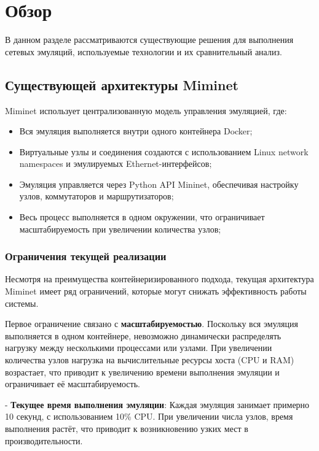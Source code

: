 
\section{Обзор}
\label{sec:relatedworks}

В данном разделе рассматриваются существующие решения для выполнения сетевых эмуляций, используемые технологии и их сравнительный анализ.

\subsection{Существующей архитектуры Miminet}

Miminet использует централизованную модель управления эмуляцией, где:
\begin{itemize}
    \item Вся эмуляция выполняется внутри одного контейнера Docker;
    \item Виртуальные узлы и соединения создаются с использованием Linux network namespaces и эмулируемых Ethernet-интерфейсов;
    \item Эмуляция управляется через Python\cite{python} API Mininet, обеспечивая настройку узлов, коммутаторов и маршрутизаторов;
    \item Весь процесс выполняется в одном окружении, что ограничивает масштабируемость при увеличении количества узлов;
\end{itemize}

\subsubsection{Ограничения текущей реализации}

Несмотря на преимущества контейнеризированного подхода, текущая архитектура Miminet имеет ряд ограничений, которые могут снижать эффективность работы системы.

Первое ограничение связано с \textbf{масштабируемостью}. Поскольку вся эмуляция выполняется в одном контейнере, невозможно динамически распределять нагрузку между несколькими процессами или узлами. При увеличении количества узлов нагрузка на вычислительные ресурсы хоста (CPU и RAM) возрастает, что приводит к увеличению времени выполнения эмуляции и ограничивает её масштабируемость.

- \textbf{Текущее время выполнения эмуляции}: Каждая эмуляция занимает примерно 10 секунд, с использованием 10\% CPU. При увеличении числа узлов, время выполнения растёт, что приводит к возникновению узких мест в производительности.


